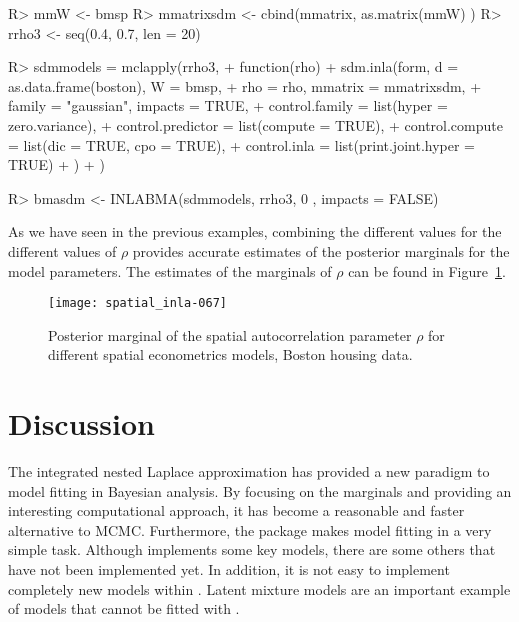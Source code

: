\documentclass[article]{jss}
\begin{document}
\begin{Schunk}
\begin{Sinput}
R> mmW <- bmsp %*% mmatrix[,-1]#Remove intercept
R> mmatrixsdm <- cbind(mmatrix, as.matrix(mmW) )
R> rrho3 <- seq(0.4, 0.7, len = 20)
\end{Sinput}
\end{Schunk}

\begin{Schunk}
\begin{Sinput}
R> sdmmodels = mclapply(rrho3,
+          function(rho) {
+                  sdm.inla(form, d = as.data.frame(boston), W = bmsp,
+  			rho = rho, mmatrix = mmatrixsdm,
+                          family = "gaussian", impacts = TRUE,
+                          control.family = list(hyper = zero.variance),
+                          control.predictor = list(compute = TRUE),
+                          control.compute = list(dic = TRUE, cpo = TRUE),
+                          control.inla = list(print.joint.hyper = TRUE)
+                  )
+          })
\end{Sinput}
\end{Schunk}

\begin{Schunk}
\begin{Sinput}
R> bmasdm <- INLABMA(sdmmodels, rrho3, 0 , impacts = FALSE)
\end{Sinput}
\end{Schunk}

As we have seen in the previous examples, combining the different values 
for the different values of $\rho$ provides accurate estimates of the posterior
marginals for the model parameters. The estimates of the marginals of
$\rho$ can be found in Figure~\ref{fig:pmargrho}.

\begin{figure}[h]
\begin{center}
\texttt{[image: spatial\_inla-067]}
\end{center}
\caption{Posterior marginal of the spatial autocorrelation parameter $\rho$
for different spatial econometrics models, Boston housing data.}
\label{fig:pmargrho}
\end{figure} 


\section{Discussion} \label{sec:disc}

The integrated nested Laplace approximation has provided a new paradigm to
model fitting in Bayesian analysis. By focusing on the marginals and providing
an interesting computational approach, it has become a reasonable and faster
alternative to MCMC. Furthermore, the  package makes model fitting
in  a very simple task.  Although  implements some key
models, there are some others that have not been implemented yet.
In addition, it is not easy to implement completely new models within 
. Latent mixture models are an important example of models that
cannot be fitted with .
\end{document}
